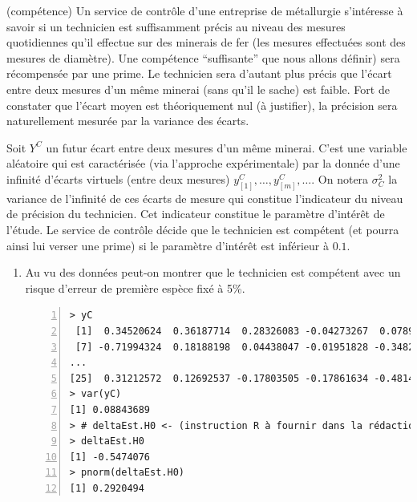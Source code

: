 \documentclass[10pt]{report}
\begin{document}
\begin{exercice} (compétence)
Un service de contr{\^o}le d'une entreprise de m{\'e}tallurgie s'int{\'e}resse {\`a} savoir si un technicien est suffisamment pr{\'e}cis au niveau des mesures quotidiennes qu'il effectue sur des minerais de fer (les mesures effectu{\'e}es sont des mesures de diam{\`e}tre). Une comp{\'e}tence ``suffisante'' que nous allons d{\'e}finir) sera r{\'e}compens{\'e}e par une prime. Le technicien sera d'autant plus précis que l'écart entre deux mesures d'un même minerai (sans qu'il le sache) est faible. Fort de constater que l'écart moyen est théoriquement nul (à justifier), la précision sera naturellement mesurée  par la variance des écarts. 

Soit $Y^C$  un futur écart entre deux mesures d'un même minerai. C'est une variable aléatoire qui est caractérisée (via l'approche expérimentale) par la donnée d'une infinité d'écarts virtuels (entre deux mesures) $y^C_{[1]},\ldots,y^C_{[m]},\ldots$. On notera $\sigma^2_C$ la variance de l'infinité de ces écarts de mesure qui constitue l'indicateur du niveau de précision du technicien. Cet indicateur  constitue le param{\`e}tre d'int{\'e}r{\^e}t de l'{\'e}tude. Le service de contr{\^o}le d{\'e}cide que le technicien est comp{\'e}tent (et pourra ainsi lui verser une prime) si le param{\`e}tre d'int{\'e}r{\^e}t est inf{\'e}rieur {\`a} $0.1$. \\

\begin{enumerate}

\item Au vu des données peut-on montrer que le technicien est compétent avec un risque d'erreur de première espèce fixé à 5\%.

\IndicR
\begin{Verbatim}[frame=leftline,fontfamily=tt,fontshape=n,numbers=left]
> yC
 [1]  0.34520624  0.36187714  0.28326083 -0.04273267  0.07897429 -0.57583456
 [7] -0.71994324  0.18188198  0.04438047 -0.01951828 -0.34820050  0.26067820
...
[25]  0.31212572  0.12692537 -0.17803505 -0.17861634 -0.48143225 -0.07185419
> var(yC)
[1] 0.08843689
> # deltaEst.H0 <- (instruction R à fournir dans la rédaction)
> deltaEst.H0
[1] -0.5474076
> pnorm(deltaEst.H0)
[1] 0.2920494
\end{Verbatim}

 



\end{enumerate}
\end{exercice}
\end{document}
